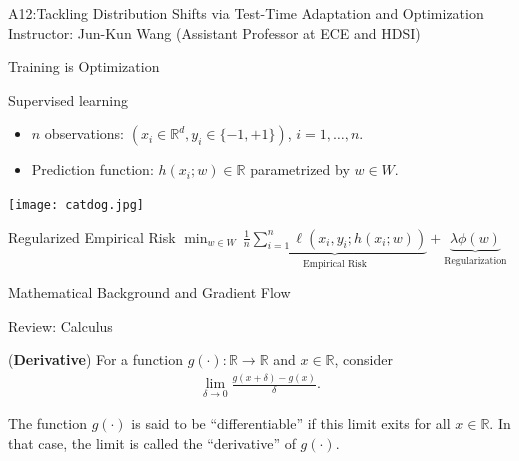 \documentclass{beamer}
\def\reals{\mathbb{R}}
\begin{document}
\begin{frame}

{\Large
A12:Tackling Distribution Shifts via Test-Time Adaptation and Optimization
}
\\
Instructor: Jun-Kun Wang (Assistant Professor at ECE and HDSI)
\end{frame}


\begin{frame}{Training is Optimization}

Supervised learning
\begin{itemize}
\item $n$ observations: $\left(x_i \in \reals^d, y_i \in \{-1,+1\} \right)$, $i=1,\dots, n$.
\item Prediction function: $h(x_i; w) \in \reals$ parametrized by $w \in W$. 
\end{itemize}
{
\centering
 \texttt{[image: catdog.jpg]}
}

\pause 

\begin{exampleblock}{Regularized Empirical Risk}
$\min_{w \in W} \, \underbrace{ \frac{1}{n} \sum_{i=1}^n \ell( x_i, y_i; h(x_i;w) ) }_{ \text{Empirical Risk} } +  \underbrace{ \lambda \phi( w ) }_{ \text{Regularization} }$
\end{exampleblock}

\end{frame}


\begin{frame}

{\Large
Mathematical Background and Gradient Flow
}
\end{frame}


\begin{frame}{Review: Calculus}

\Large 
(\textbf{Derivative}) For a function $g(\cdot): \reals \to \reals$ and $x \in \reals$,
consider
\begin{align*}
    \lim_{\delta \to 0} \frac{g(x+\delta) - g(x)}{\delta}.
\end{align*}

\pause

\begin{block}{}
The function $g(\cdot)$ is said to be ``differentiable'' if this limit exits for all $x \in \reals$. In that case, the limit is called the ``derivative'' of $g(\cdot)$.
\end{block}

\end{frame}
\end{document}
